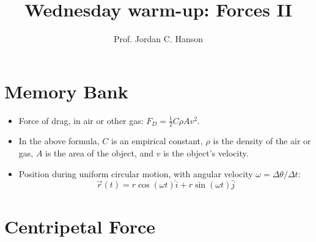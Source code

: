 \documentclass{article}
\begin{document}
\twocolumn

\title{Wednesday warm-up: Forces II}
\author{Prof. Jordan C. Hanson}

\maketitle

\section{Memory Bank}

\begin{itemize}
\item Force of drag, in air or other gas: $F_D = \frac{1}{2}C \rho A v^2$.
\item In the above formula, $C$ is an empirical constant, $\rho$ is the density of the air or gas, $A$ is the area of the object, and $v$ is the object's velocity.
\item Position during uniform circular motion, with angular velocity $\omega = \Delta \theta / \Delta t$:
\begin{equation}
\vec{r}(t) = r\cos(\omega t)\hat{i} + r\sin(\omega t)\hat{j} \label{eq:1}
\end{equation}
\end{itemize}

\section{Centripetal Force}
\end{document}
